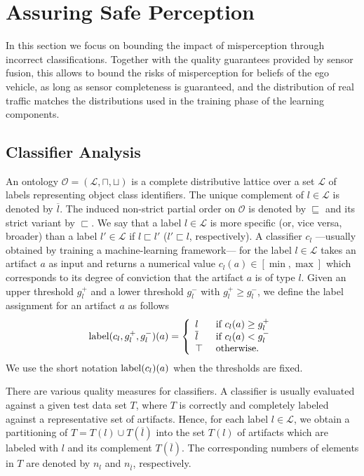 \section{Assuring Safe Perception}\label{sec:proofrule}

In this section we focus on bounding the impact of misperception through incorrect classifications. Together with the quality guarantees provided by sensor fusion, this allows to bound the risks of misperception for beliefs of the ego vehicle, as long as sensor completeness is guaranteed, and the distribution of real traffic matches the distributions used in the training phase of the learning components. 

\subsection{Classifier Analysis}
An ontology $\mathcal O=(\mathcal L,\sqcap,\sqcup)$ is a complete distributive lattice over a set $\mathcal L$ of labels representing object class identifiers. The unique complement of $l\in\mathcal L$ is denoted by $\overline l$. The induced non-strict partial order on $\mathcal O$ is denoted by $\sqsubseteq$ and its strict variant by $\sqsubset$. We say that a label $l\in\mathcal L$ is more specific (or, vice versa, broader) than a label $l'\in\mathcal L$ if $l\sqsubset l'$ ($l'\sqsubset l$, respectively). A classifier $c_l$ ---usually obtained by training a machine-learning framework--- for the label $l\in\mathcal L$ takes an artifact $a$ as input and returns a numerical value $c_l(a) \in [\min,\max]$ which corresponds to its degree of conviction that the artifact $a$ is of type $l$.
Given an upper threshold $g_l^+$ and a lower threshold $g_l^-$ with $g_l^+\geq g_l^-$, we define the label assignment for an artifact $a$ as follows
\begin{gather*}
    \mathrm{label}(c_l,g_l^+,g_l^-)(a) = \left\{
    \begin{array}{ll}
    l & \text{ if } c_l(a) \geq g_l^+\\
    \overline l & \text{ if } c_l(a) < g_l^-\\
    \top & \text{ otherwise.}
    \end{array}\right.
\end{gather*}
We use the short notation $\mathrm{label}(c_l)(a)$ when the thresholds are fixed. 

There are various quality measures for classifiers. A classifier is usually evaluated against a given test data set $T$, where $T$ is correctly and completely labeled against a representative set of artifacts. Hence, for each label $l\in\mathcal L$, we obtain a partitioning of $T=T(l) \cup T(\overline l)$ into the set $T(l)$ of artifacts which are labeled with $l$ and its complement $T(\overline l)$. The corresponding numbers of elements in $T$ are denoted by $n_l$ and $n_{\overline l}$, respectively.

